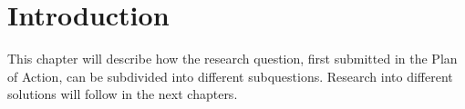 \section{Introduction}
This chapter will describe how the research question, first submitted in the Plan of Action, can be subdivided into different subquestions. Research into different solutions will follow in the next chapters.